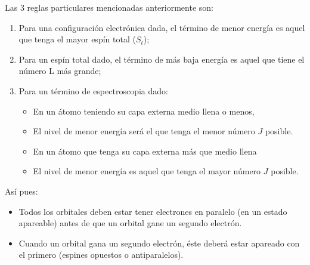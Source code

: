 
Las 3 reglas particulares mencionadas anteriormente son:

\begin{enumerate}
    \item Para una configuración electrónica dada, el término de menor energía es aquel que tenga el mayor espín total ($S_{t}$);
    \item Para un espín total dado, el término de más baja energía es aquel que tiene el número L más grande;
    \item Para un término de espectroscopia dado:
        \begin{itemize}
            \item En un átomo teniendo su capa externa medio llena o menos,
            \item El nivel de menor energía será el que tenga el menor número $J$ posible.
            \item En un átomo que tenga su capa externa más que medio llena
            \item El nivel de menor energía es aquel que tenga el mayor número $J$ posible.
        \end{itemize}
\end{enumerate}

Así pues:

\begin{itemize}
    \item Todos los orbitales deben estar tener electrones en paralelo (en un estado apareable) antes de que un orbital gane un segundo electrón.
    \item Cuando un orbital gana un segundo electrón, éste deberá estar apareado con el primero (espines opuestos o antiparalelos).
\end{itemize}
